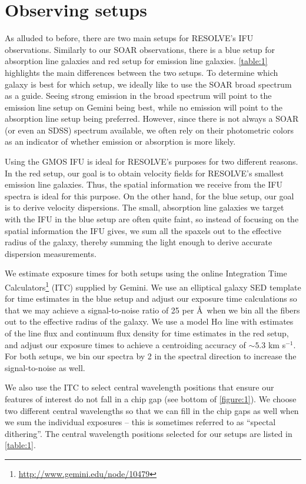\documentclass[12pt]{report}
\begin{document}
\section{Observing setups}
\label{setups}
As alluded to before, there are two main setups for RESOLVE's IFU observations. Similarly to our SOAR observations, there is a blue setup for absorption line galaxies and red setup for emission line galaxies. \autoref{table:1} highlights the main differences between the two setups. To determine which galaxy is best for which setup, we ideally like to use the SOAR broad spectrum as a guide. Seeing strong emission in the broad spectrum will point to the emission line setup on Gemini being best, while no emission will point to the absorption line setup being preferred. However, since there is not always a SOAR (or even an SDSS) spectrum available, we often rely on their photometric colors as an indicator of whether emission or absorption is more likely.

Using the GMOS IFU is ideal for RESOLVE's purposes for two different reasons. In the red setup, our goal is to obtain velocity fields for RESOLVE's smallest emission line galaxies. Thus, the spatial information we receive from the IFU spectra is ideal for this purpose. On the other hand, for the blue setup, our goal is to derive velocity dispersions. The small, absorption line galaxies we target with the IFU in the blue setup are often quite faint, so instead of focusing on the spatial information the IFU gives, we sum all the spaxels out to the effective radius of the galaxy, thereby summing the light enough to derive accurate dispersion measurements. 

We estimate exposure times for both setups using the online Integration Time Calculators\footnote{\url{http://www.gemini.edu/node/10479}} (ITC) supplied by Gemini. We use an elliptical galaxy SED template for time estimates in the blue setup and adjust our exposure time calculations so that we may achieve a signal-to-noise ratio of 25 per \AA\ when we bin all the fibers out to the effective radius of the galaxy. We use a model H$\alpha$ line with estimates of the line flux and continuum flux density for time estimates in the red setup, and adjust our exposure times to achieve a centroiding accuracy of $\sim5.3$ km s$^{-1}$. For both setups, we bin our spectra by 2 in the spectral direction to increase the signal-to-noise as well.

We also use the ITC to select central wavelength positions that ensure our features of interest do not fall in a chip gap (see bottom of \autoref{figure:1}). We choose two different central wavelengths so that we can fill in the chip gaps as well when we sum the individual exposures -- this is sometimes referred to as ``spectal dithering''. The central wavelength positions selected for our setups are listed in \autoref{table:1}.
\end{document}
